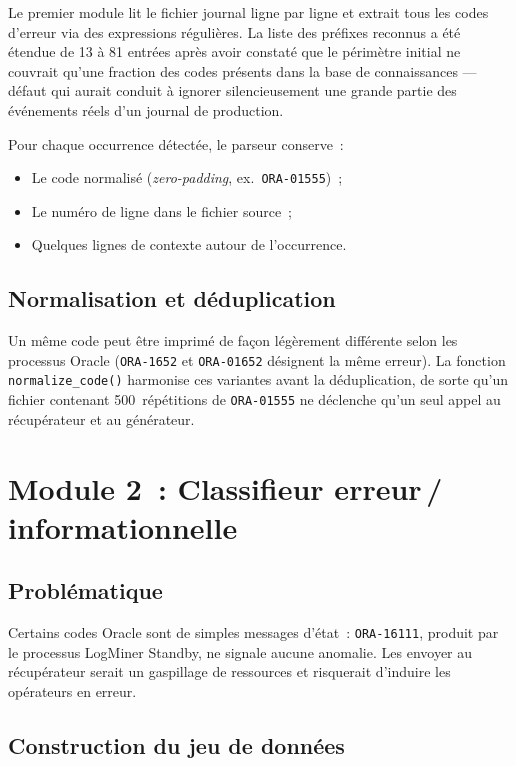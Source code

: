 \documentclass[12pt,a4paper]{report}
\begin{document}
Le premier module lit le fichier journal ligne par ligne et extrait tous les codes
d'erreur via des expressions r\'eguli\`eres. La liste des pr\'efixes reconnus a \'et\'e
\'etendue de 13 \`a 81 entr\'ees apr\`es avoir constat\'e que le p\'erim\`etre initial
ne couvrait qu'une fraction des codes pr\'esents dans la base de connaissances ---
d\'efaut qui aurait conduit \`a ignorer silencieusement une grande partie des \'ev\'enements
r\'eels d'un journal de production.

Pour chaque occurrence d\'etect\'ee, le parseur conserve~:
\begin{itemize}[leftmargin=*]
  \item Le code normalis\'e (\emph{zero-padding}, ex.~\texttt{ORA-01555})~;
  \item Le num\'ero de ligne dans le fichier source~;
  \item Quelques lignes de contexte autour de l'occurrence.
\end{itemize}

\subsection{Normalisation et d\'eduplication}

Un m\^eme code peut \^etre imprim\'e de fa\c con l\'eg\`erement diff\'erente selon les
processus Oracle (\texttt{ORA-1652} et \texttt{ORA-01652} d\'esignent la m\^eme erreur).
La fonction \texttt{normalize\_code()} harmonise ces variantes avant la d\'eduplication,
de sorte qu'un fichier contenant 500~r\'ep\'etitions de \texttt{ORA-01555} ne d\'eclenche
qu'un seul appel au r\'ecup\'erateur et au g\'en\'erateur.

\section{Module 2~: Classifieur erreur\,/\,informationnelle}

\subsection{Probl\'ematique}

Certains codes Oracle sont de simples messages d'\'etat~: \texttt{ORA-16111}, produit
par le processus LogMiner Standby, ne signale aucune anomalie. Les envoyer au
r\'ecup\'erateur serait un gaspillage de ressources et risquerait d'induire les
op\'erateurs en erreur.

\subsection{Construction du jeu de donn\'ees}
\end{document}
